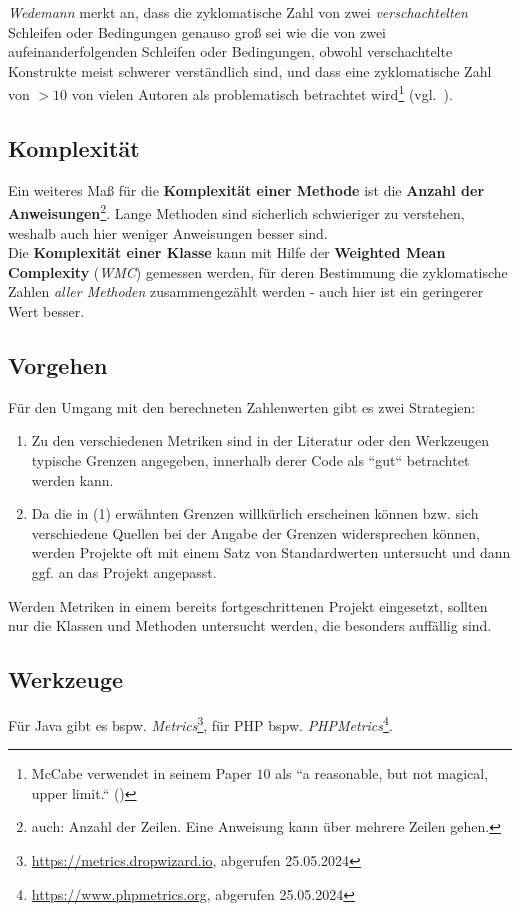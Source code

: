 \noindent
\textit{Wedemann} merkt an, dass die zyklomatische Zahl von zwei \textit{verschachtelten} Schleifen oder Bedingungen genauso groß sei wie die von zwei aufeinanderfolgenden Schleifen oder Bedingungen, obwohl verschachtelte Konstrukte meist schwerer verständlich sind, und dass eine zyklomatische Zahl von $>10$ von vielen Autoren als problematisch betrachtet wird\footnote{
McCabe verwendet in seinem Paper $10$ als ``a reasonable, but not magical,  upper limit.`` (\cite[314]{McC76})
} (vgl.~\cite[38]{Wed09c}).


\subsection*{Komplexität}
Ein weiteres Maß für die \textbf{Komplexität einer Methode} ist die \textbf{Anzahl der Anweisungen}\footnote{auch: Anzahl der Zeilen. Eine Anweisung kann über mehrere Zeilen gehen.}.
Lange Methoden sind sicherlich schwieriger zu verstehen, weshalb auch hier weniger Anweisungen besser sind.\\
Die \textbf{Komplexität einer Klasse} kann mit Hilfe der \textbf{Weighted Mean Complexity} (\textit{WMC}) gemessen werden, für deren Bestimmung die zyklomatische Zahlen \textit{aller Methoden} zusammengezählt werden - auch hier ist ein geringerer Wert besser.

\subsection*{Vorgehen}
Für den Umgang mit den berechneten Zahlenwerten gibt es zwei Strategien:

\begin{enumerate}
    \item Zu den verschiedenen Metriken sind in der Literatur oder den Werkzeugen typische Grenzen angegeben, innerhalb derer Code als ``gut`` betrachtet werden kann.
    \item Da die in (1) erwähnten Grenzen willkürlich erscheinen können bzw. sich verschiedene Quellen bei der Angabe der Grenzen widersprechen können, werden Projekte oft mit einem Satz von Standardwerten untersucht und dann ggf. an das Projekt angepasst.
\end{enumerate}

\noindent
Werden Metriken in einem bereits fortgeschrittenen Projekt eingesetzt, sollten nur die Klassen und Methoden untersucht werden, die besonders auffällig sind.

\subsection*{Werkzeuge}
Für Java gibt es bspw. \textit{Metrics}\footnote{
\url{https://metrics.dropwizard.io}, abgerufen 25.05.2024
}, für PHP bspw. \textit{PHPMetrics}\footnote{
    \url{https://www.phpmetrics.org}, abgerufen 25.05.2024
}.


